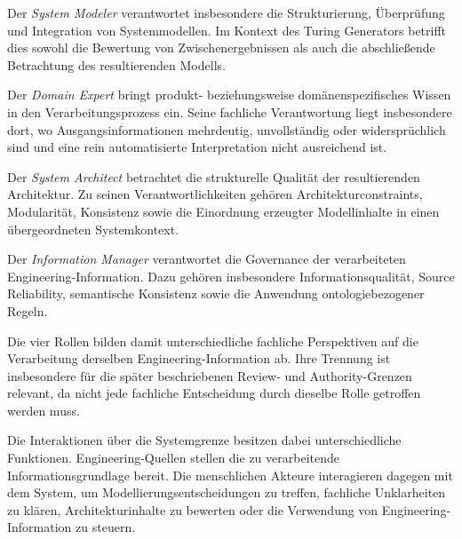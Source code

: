 Der \emph{System Modeler} verantwortet insbesondere die Strukturierung,
Überprüfung und Integration von Systemmodellen. Im Kontext des Turing Generators
betrifft dies sowohl die Bewertung von Zwischenergebnissen als auch die
abschließende Betrachtung des resultierenden Modells.

Der \emph{Domain Expert} bringt produkt- beziehungsweise domänenspezifisches
Wissen in den Verarbeitungsprozess ein. Seine fachliche Verantwortung liegt
insbesondere dort, wo Ausgangsinformationen mehrdeutig, unvollständig oder
widersprüchlich sind und eine rein automatisierte Interpretation nicht
ausreichend ist.

Der \emph{System Architect} betrachtet die strukturelle Qualität der
resultierenden Architektur. Zu seinen Verantwortlichkeiten gehören
Architekturconstraints, Modularität, Konsistenz sowie die Einordnung erzeugter
Modellinhalte in einen übergeordneten Systemkontext.

Der \emph{Information Manager} verantwortet die Governance der verarbeiteten
Engineering-Information. Dazu gehören insbesondere Informationsqualität,
Source Reliability, semantische Konsistenz sowie die Anwendung
ontologiebezogener Regeln.

Die vier Rollen bilden damit unterschiedliche fachliche Perspektiven auf die
Verarbeitung derselben Engineering-Information ab. Ihre Trennung ist
insbesondere für die später beschriebenen Review- und Authority-Grenzen
relevant, da nicht jede fachliche Entscheidung durch dieselbe Rolle getroffen
werden muss.

%
%

Die Interaktionen über die Systemgrenze besitzen dabei unterschiedliche
Funktionen. Engineering-Quellen stellen die zu verarbeitende
Informationsgrundlage bereit. Die menschlichen Akteure interagieren dagegen mit
dem System, um Modellierungsentscheidungen zu treffen, fachliche Unklarheiten zu
klären, Architekturinhalte zu bewerten oder die Verwendung von
Engineering-Information zu steuern.

